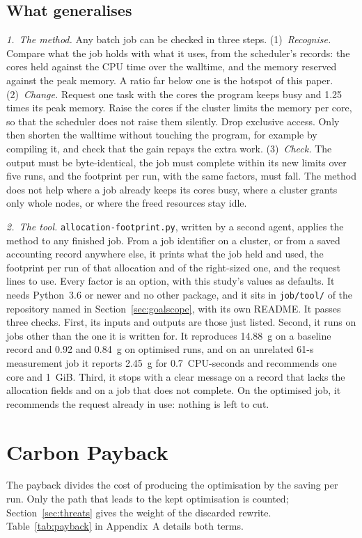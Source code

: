 \documentclass[conference,a4paper]{IEEEtran}
\begin{document}
\subsection{What generalises}\label{sec:generalises}
\emph{1.~The method.} Any batch job can be checked in three steps.
(1)~\emph{Recognise.} Compare what the job holds with what it uses, from the
scheduler's records: the cores held against the CPU time over the walltime, and
the memory reserved against the peak memory. A ratio far below one is the
hotspot of this paper.
(2)~\emph{Change.} Request one task with the cores the program keeps busy and
1.25 times its peak memory. Raise the cores if the cluster limits the memory per
core, so that the scheduler does not raise them silently. Drop exclusive access.
Only then shorten the walltime without touching the program, for example by
compiling it, and check that the gain repays the extra work.
(3)~\emph{Check.} The output must be byte-identical, the job must complete
within its new limits over five runs, and the footprint per run, with the same
factors, must fall.
The method does not help where a job already keeps its cores busy, where a
cluster grants only whole nodes, or where the freed resources stay idle.

\emph{2.~The tool.} \texttt{allocation-footprint.py}, written by a second
agent, applies the method to any finished job. From a job identifier on a
cluster, or from a saved accounting record anywhere else, it prints what the job
held and used, the footprint per run of that allocation and of the right-sized
one, and the request lines to use. Every factor is an option, with this study's
values as defaults. It needs Python~3.6 or newer and no other package, and it
sits in \texttt{job/tool/} of the repository named in
Section~\ref{sec:goalscope}, with its own README.
It passes three checks. First, its inputs and outputs are those just listed.
Second, it runs on jobs other than the one it is written for. It reproduces
14.88~g on a baseline record and 0.92 and 0.84~g on optimised runs, and on an
unrelated 61-s measurement job it reports 2.45~g for 0.7~CPU-seconds and
recommends one core and 1~GiB. Third, it stops with a clear message on a record
that lacks the allocation fields and on a job that does not complete. On the
optimised job, it recommends the request already in use: nothing is left to
cut.

\section{Carbon Payback}\label{sec:payback}
The payback divides the cost of producing the optimisation by the saving per
run. Only the path that leads to the kept optimisation is counted;
Section~\ref{sec:threats} gives the weight of the discarded rewrite.
Table~\ref{tab:payback} in Appendix~A details both terms.
\end{document}
